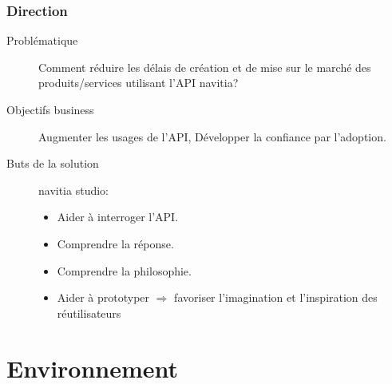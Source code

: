\documentclass[table]{beamer}
\begin{document}
\begin{frame}
  \frametitle{Direction}

  \begin{description}
  \item[Problématique] Comment réduire les délais de création et de
    mise sur le marché des produits/services utilisant l'API navitia?
  \item[Objectifs business] Augmenter les usages de l'API, Développer
    la confiance par l'adoption.
  \item[Buts de la solution] navitia studio:
    \begin{itemize}
    \item Aider à interroger l'API.
    \item Comprendre la réponse.
    \item Comprendre la philosophie.
    \item Aider à prototyper $\Rightarrow$ favoriser l'imagination et
      l'inspiration des réutilisateurs
    \end{itemize}
  \end{description}
\end{frame}


\section{Environnement}
\end{document}
